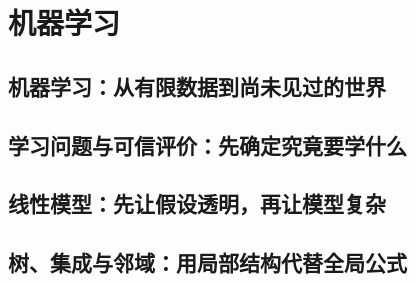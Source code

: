 \documentclass[UTF8,openany]{ctexbook}
\theoremstyle{definition}
\theoremstyle{plain}
\begin{document}
\part{机器学习}
\chapter*{机器学习：从有限数据到尚未见过的世界}
\label{ch:108}

\clearpage
\chapter*{学习问题与可信评价：先确定究竟要学什么}
\label{ch:109}





\clearpage
\chapter*{线性模型：先让假设透明，再让模型复杂}
\label{ch:110}






\clearpage
\chapter*{树、集成与邻域：用局部结构代替全局公式}
\label{ch:111}




\clearpage
\end{document}
